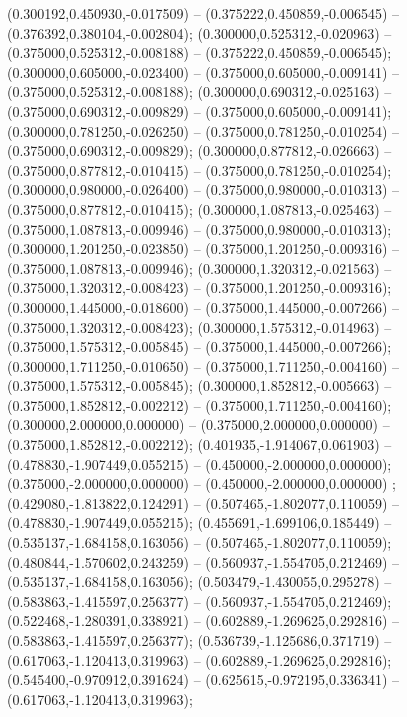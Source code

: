  (0.300192,0.450930,-0.017509) -- (0.375222,0.450859,-0.006545) -- (0.376392,0.380104,-0.002804);
 (0.300000,0.525312,-0.020963) -- (0.375000,0.525312,-0.008188) -- (0.375222,0.450859,-0.006545);
 (0.300000,0.605000,-0.023400) -- (0.375000,0.605000,-0.009141) -- (0.375000,0.525312,-0.008188);
 (0.300000,0.690312,-0.025163) -- (0.375000,0.690312,-0.009829) -- (0.375000,0.605000,-0.009141);
 (0.300000,0.781250,-0.026250) -- (0.375000,0.781250,-0.010254) -- (0.375000,0.690312,-0.009829);
 (0.300000,0.877812,-0.026663) -- (0.375000,0.877812,-0.010415) -- (0.375000,0.781250,-0.010254);
 (0.300000,0.980000,-0.026400) -- (0.375000,0.980000,-0.010313) -- (0.375000,0.877812,-0.010415);
 (0.300000,1.087813,-0.025463) -- (0.375000,1.087813,-0.009946) -- (0.375000,0.980000,-0.010313);
 (0.300000,1.201250,-0.023850) -- (0.375000,1.201250,-0.009316) -- (0.375000,1.087813,-0.009946);
 (0.300000,1.320312,-0.021563) -- (0.375000,1.320312,-0.008423) -- (0.375000,1.201250,-0.009316);
 (0.300000,1.445000,-0.018600) -- (0.375000,1.445000,-0.007266) -- (0.375000,1.320312,-0.008423);
 (0.300000,1.575312,-0.014963) -- (0.375000,1.575312,-0.005845) -- (0.375000,1.445000,-0.007266);
 (0.300000,1.711250,-0.010650) -- (0.375000,1.711250,-0.004160) -- (0.375000,1.575312,-0.005845);
 (0.300000,1.852812,-0.005663) -- (0.375000,1.852812,-0.002212) -- (0.375000,1.711250,-0.004160);
 (0.300000,2.000000,0.000000) -- (0.375000,2.000000,0.000000) -- (0.375000,1.852812,-0.002212);
 (0.401935,-1.914067,0.061903) -- (0.478830,-1.907449,0.055215) -- (0.450000,-2.000000,0.000000);
 (0.375000,-2.000000,0.000000) -- (0.450000,-2.000000,0.000000) ;
 (0.429080,-1.813822,0.124291) -- (0.507465,-1.802077,0.110059) -- (0.478830,-1.907449,0.055215);
 (0.455691,-1.699106,0.185449) -- (0.535137,-1.684158,0.163056) -- (0.507465,-1.802077,0.110059);
 (0.480844,-1.570602,0.243259) -- (0.560937,-1.554705,0.212469) -- (0.535137,-1.684158,0.163056);
 (0.503479,-1.430055,0.295278) -- (0.583863,-1.415597,0.256377) -- (0.560937,-1.554705,0.212469);
 (0.522468,-1.280391,0.338921) -- (0.602889,-1.269625,0.292816) -- (0.583863,-1.415597,0.256377);
 (0.536739,-1.125686,0.371719) -- (0.617063,-1.120413,0.319963) -- (0.602889,-1.269625,0.292816);
 (0.545400,-0.970912,0.391624) -- (0.625615,-0.972195,0.336341) -- (0.617063,-1.120413,0.319963);
